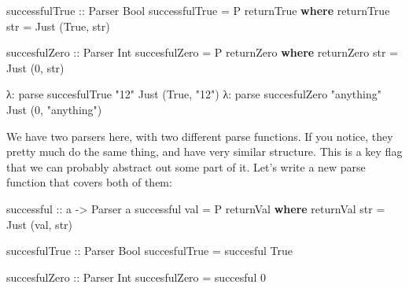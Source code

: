 \documentclass[]{article}
\newenvironment{Shaded}{}{}
\newcommand{\KeywordTok}[1]{\textcolor[rgb]{0.00,0.44,0.13}{\textbf{{#1}}}}
\newcommand{\DataTypeTok}[1]{\textcolor[rgb]{0.56,0.13,0.00}{{#1}}}
\newcommand{\DecValTok}[1]{\textcolor[rgb]{0.25,0.63,0.44}{{#1}}}
\newcommand{\StringTok}[1]{\textcolor[rgb]{0.25,0.44,0.63}{{#1}}}
\newcommand{\OtherTok}[1]{\textcolor[rgb]{0.00,0.44,0.13}{{#1}}}
\newcommand{\FunctionTok}[1]{\textcolor[rgb]{0.02,0.16,0.49}{{#1}}}
\newcommand{\NormalTok}[1]{{#1}}
\begin{document}
\begin{Shaded}
\begin{Highlighting}[]
\OtherTok{successfulTrue ::} \DataTypeTok{Parser} \DataTypeTok{Bool}
\NormalTok{successfulTrue }\FunctionTok{=} \DataTypeTok{P} \NormalTok{returnTrue}
    \KeywordTok{where}
        \NormalTok{returnTrue str }\FunctionTok{=} \DataTypeTok{Just} \NormalTok{(}\DataTypeTok{True}\NormalTok{, str)}

\OtherTok{succesfulZero ::} \DataTypeTok{Parser} \DataTypeTok{Int}
\NormalTok{succesfulZero }\FunctionTok{=} \DataTypeTok{P} \NormalTok{returnZero}
    \KeywordTok{where}
        \NormalTok{returnZero str }\FunctionTok{=} \DataTypeTok{Just} \NormalTok{(}\DecValTok{0}\NormalTok{, str)}
\end{Highlighting}
\end{Shaded}

\begin{Shaded}
\begin{Highlighting}[]
\NormalTok{λ}\FunctionTok{:} \NormalTok{parse succesfulTrue }\StringTok{"12"}
\DataTypeTok{Just} \NormalTok{(}\DataTypeTok{True}\NormalTok{, }\StringTok{"12"}\NormalTok{)}
\NormalTok{λ}\FunctionTok{:} \NormalTok{parse succesfulZero }\StringTok{"anything"}
\DataTypeTok{Just} \NormalTok{(}\DecValTok{0}\NormalTok{, }\StringTok{"anything"}\NormalTok{)}
\end{Highlighting}
\end{Shaded}

We have two parsers here, with two different parse functions. If you notice,
they pretty much do the same thing, and have very similar structure. This is a
key flag that we can probably abstract out some part of it. Let's write a new
parse function that covers both of them:

\begin{Shaded}
\begin{Highlighting}[]
\OtherTok{successful ::} \NormalTok{a }\OtherTok{->} \DataTypeTok{Parser} \NormalTok{a}
\NormalTok{successful val }\FunctionTok{=} \DataTypeTok{P} \NormalTok{returnVal}
    \KeywordTok{where}
        \NormalTok{returnVal str }\FunctionTok{=} \DataTypeTok{Just} \NormalTok{(val, str)}

\OtherTok{succesfulTrue ::} \DataTypeTok{Parser} \DataTypeTok{Bool}
\NormalTok{succesfulTrue }\FunctionTok{=} \NormalTok{succesful }\DataTypeTok{True}

\OtherTok{succesfulZero ::} \DataTypeTok{Parser} \DataTypeTok{Int}
\NormalTok{succesfulZero }\FunctionTok{=} \NormalTok{succesful }\DecValTok{0}
\end{Highlighting}
\end{Shaded}
\end{document}
